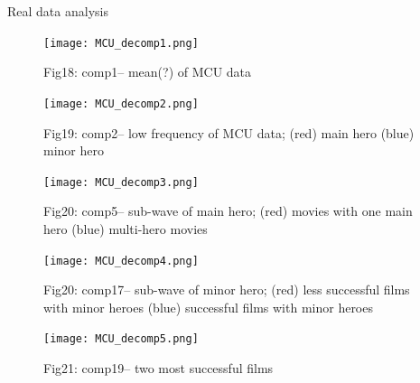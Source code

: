 \documentclass[
  ignorenonframetext,
]{beamer}
\begin{document}
\begin{frame}{Real data analysis}
\label{real-data-analysis-6}
\begin{block}{1}
\begin{figure}[H]

{\centering \texttt{[image: MCU\_decomp1.png]}

}

\caption{Fig18: comp1-- mean(?) of MCU data}

\end{figure}%
\end{block}

\begin{block}{2}
\begin{figure}[H]

{\centering \texttt{[image: MCU\_decomp2.png]}

}

\caption{Fig19: comp2-- low frequency of MCU data; (red) main hero
(blue) minor hero}

\end{figure}%
\end{block}

\begin{block}{5}
\begin{figure}[H]

{\centering \texttt{[image: MCU\_decomp3.png]}

}

\caption{Fig20: comp5-- sub-wave of main hero; (red) movies with one
main hero (blue) multi-hero movies}

\end{figure}%
\end{block}

\begin{block}{17}
\begin{figure}[H]

{\centering \texttt{[image: MCU\_decomp4.png]}

}

\caption{Fig20: comp17-- sub-wave of minor hero; (red) less successful
films with minor heroes (blue) successful films with minor heroes}

\end{figure}%
\end{block}

\begin{block}{19}
\begin{figure}[H]

{\centering \texttt{[image: MCU\_decomp5.png]}

}

\caption{Fig21: comp19-- two most successful films}

\end{figure}%
\end{block}
\end{frame}
\end{document}
